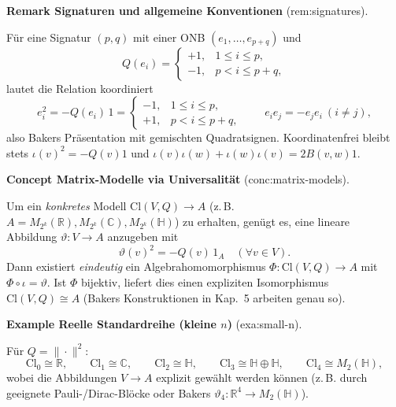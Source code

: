 \documentclass[10pt, letterpaper]{article}
\newcommand{\R}{\mathbb{R}}
\newcommand{\C}{\mathbb{C}}
\newcommand{\QU}{\mathbb{H}}
\newcommand{\Cl}{\mathrm{Cl}}
\newcommand{\CustomHeading}[3]{%
  \par\medskip\noindent%
  \textbf{#1 #2} \textnormal{(#3)}.\enskip%
}
\newenvironment{REM}[2]{\begin{unitbox}\CustomHeading{Remark}{#1}{#2}}{\end{unitbox}}
\newenvironment{EXA}[2]{\begin{unitbox}\CustomHeading{Example}{#1}{#2}}{\end{unitbox}}
\newenvironment{CONC}[2]{\begin{unitbox}\CustomHeading{Concept}{#1}{#2}}{\end{unitbox}}
\begin{document}
\begin{REM}{Signaturen und allgemeine Konventionen}{rem:signatures}
Für eine Signatur $(p,q)$ mit einer ONB $(e_1,\dots,e_{p+q})$ und
\[
Q(e_i)=\begin{cases}
+1,& 1\le i\le p,\\
-1,& p<i\le p+q,
\end{cases}
\]
lautet die Relation koordiniert
\[
e_i^2=-Q(e_i)\,1=\begin{cases}
-1,& 1\le i\le p,\\
+1,& p<i\le p+q,
\end{cases}
\qquad
e_ie_j=-e_je_i\ (i\ne j),
\]
also Bakers Präsentation mit gemischten Quadratsignen. Koordinatenfrei bleibt stets
$\iota(v)^2=-Q(v)1$ und $\iota(v)\iota(w)+\iota(w)\iota(v)=2B(v,w)1$.
\end{REM}

\begin{CONC}{Matrix-Modelle via Universalität}{conc:matrix-models}
Um ein \emph{konkretes} Modell $\Cl(V,Q)\to A$ (z.\,B. $A=M_{2^k}(\R),M_{2^k}(\C),M_{2^k}(\QU)$) zu erhalten,
genügt es, eine lineare Abbildung $\vartheta:V\to A$ anzugeben mit
\[
\vartheta(v)^2=-Q(v)\,1_A\quad(\forall v\in V).
\]
Dann existiert \emph{eindeutig} ein Algebrahomomorphismus
$\Phi:\Cl(V,Q)\to A$ mit $\Phi\circ\iota=\vartheta$.
Ist $\Phi$ bijektiv, liefert dies einen expliziten Isomorphismus
$\Cl(V,Q)\cong A$ (Bakers Konstruktionen in Kap.~5 arbeiten genau so).
\end{CONC}

\begin{EXA}{Reelle Standardreihe (kleine $n$)}{exa:small-n}
Für $Q=\|\cdot\|^2$:
\[
\Cl_0\cong\R,\qquad
\Cl_1\cong\C,\qquad
\Cl_2\cong\QU,\qquad
\Cl_3\cong\QU\oplus\QU,\qquad
\Cl_4\cong M_2(\QU),
\]
wobei die Abbildungen $V\to A$ explizit gewählt werden können (z.\,B. durch
geeignete Pauli-/Dirac-Blöcke oder Bakers $\vartheta_4:\R^4\to M_2(\QU)$).
\end{EXA}
\end{document}
